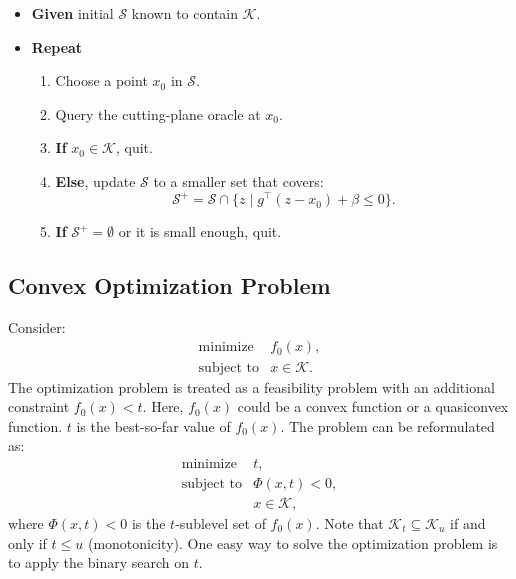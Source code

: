 \documentclass[final,leqno]{siamltex}
\providecommand{\tightlist}{%
  \setlength{\itemsep}{0pt}\setlength{\parskip}{0pt}}
\begin{document}
\begin{itemize}
\tightlist
\item
  \textbf{Given} initial \(\mathcal{S}\) known to contain \(\mathcal{K}\).
\item
  \textbf{Repeat}

  \begin{enumerate}
  \def\labelenumi{\arabic{enumi}.}
  \tightlist
  \item
    Choose a point \(x_0\) in \(\mathcal{S}\).
  \item
    Query the cutting-plane oracle at \(x_0\).
  \item
    \textbf{If} \(x_0 \in \mathcal{K}\), quit.
  \item
    \textbf{Else}, update \(\mathcal{S}\) to a smaller set that covers:
    \[\mathcal{S}^+ = \mathcal{S} \cap \{z \mid g^\top (z - x_0) + \beta \leq 0\}.\]
  \item
    \textbf{If} \(\mathcal{S}^+ = \emptyset\) or it is small enough, quit.
  \end{enumerate}
\end{itemize}

\hypertarget{sec:convex-optimization-problem}{%
\subsection{Convex Optimization Problem}\label{sec:convex-optimization-problem}}

Consider:
\begin{equation}\begin{array}{ll}
    \text{minimize}     & f_0(x), \\
    \text{subject to}   & x \in \mathcal{K}.
  \end{array}
\label{eq:convex-optimization}\end{equation}
The optimization problem is treated as a feasibility problem with an additional constraint \(f_0(x) < t\). Here, \(f_0(x)\) could be a convex function or a quasiconvex function. \(t\) is the best-so-far value of \(f_0(x)\). The problem can be reformulated as:
\begin{equation}\begin{array}{ll}
    \text{minimize}   & t, \\
    \text{subject to} & \Phi(x, t) < 0, \\
                      & x \in \mathcal{K},
  \end{array}
\label{eq:cvx-in-feasibility-form}\end{equation}
where \(\Phi(x, t) < 0\) is the \(t\)-sublevel set of \(f_0(x)\). Note that \(\mathcal{K}_t \subseteq \mathcal{K}_u\) if and only if \(t \leq u\) (monotonicity). One easy way to solve the optimization problem is to apply the binary search on \(t\).
\end{document}
